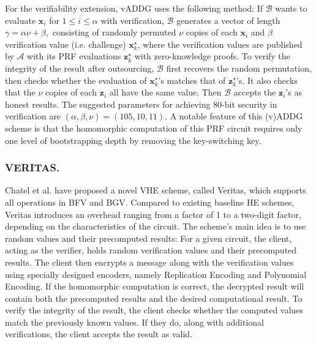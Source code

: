 \documentclass[runningheads]{llncs}
\newcommand{\cc}[1]{\mathcal{#1}} %
\begin{document}
        For the verifiability extension, vADDG uses the following method: If $\cc B$ wants to evaluate \(\mathbf{x}_i\) for \(1 \leq i \leq \alpha\) with verification, \(\mathcal{B}\) generates a vector of length 
        \(
        \gamma = \alpha \nu + \beta,
        \)
        consisting of randomly permuted \(\nu\) copies of each \(\mathbf{x}_i\) and \(\beta\) verification value (i.e. challenge) \(\mathbf{x}^\star_k\), where the verification values are published by $\cc A$ with its PRF evaluations $\mathbf{z}^\star_k$ with zero-knowledge proofs. To verify the integrity of the result after outsourcing, \(\mathcal{B}\) first recovers the random permutation, then checks whether the evaluation of \(\mathbf{x}^\star_k\)'s matches that of \(\mathbf{z}^\star_k\)'s. It also checks that the \(\nu\) copies of each \(\mathbf{z}_i\) all have the same value. Then $\cc B$ accepts the \(\mathbf{z}_i\)'s as honest results. 
        The suggested parameters for achieving 80-bit security in verification are 
        \(
        (\alpha, \beta, \nu) = (105, 10, 11).
        \)
        A notable feature of this (v)ADDG scheme is that the homomorphic computation of this PRF circuit requires only one level of bootstrapping depth by removing the key-switching key.

        \subsubsection{VERITAS.} 
        Chatel et al. have proposed a novel VHE scheme, called Veritas, which supports all operations in BFV and BGV. Compared to existing baseline HE schemes, Veritas introduces an overhead ranging from a factor of 1 to a two-digit factor, depending on the characteristics of the circuit. The scheme's main idea is to use random values and their precomputed results: For a given circuit, the client, acting as the verifier, holds random verification values and their precomputed results. The client then encrypts a message along with the verification values using specially designed encoders, namely Replication Encoding and Polynomial Encoding. If the homomorphic computation is correct, the decrypted result will contain both the precomputed results and the desired computational result. To verify the integrity of the result, the client checks whether the computed values match the previously known values. If they do, along with additional verifications, the client accepts the result as valid.
\end{document}
